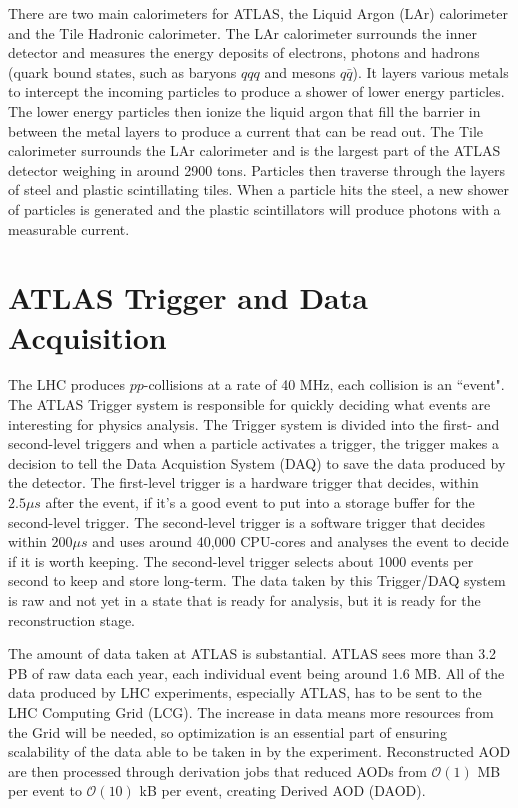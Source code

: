 There are two main calorimeters for ATLAS, the Liquid Argon (LAr) calorimeter and the Tile Hadronic calorimeter.
The LAr calorimeter surrounds the inner detector and measures the energy deposits of electrons, photons and hadrons (quark bound states, such as baryons $qqq$ and mesons $q\bar{q}$). 
It layers various metals to intercept the incoming particles to produce a shower of lower energy particles. 
The lower energy particles then ionize the liquid argon that fill the barrier in between the metal layers to produce a current that can be read out.
The Tile calorimeter surrounds the LAr calorimeter and is the largest part of the ATLAS detector weighing in around 2900 tons. 
Particles then traverse through the layers of steel and plastic scintillating tiles. 
When a particle hits the steel, a new shower of particles is generated and the plastic scintillators will produce photons with a measurable current.

\section{ATLAS Trigger and Data Acquisition}

The LHC produces $pp$-collisions at a rate of 40 MHz, each collision is an ``event". 
The ATLAS Trigger system is responsible for quickly deciding what events are interesting for physics analysis.
The Trigger system is divided into the first- and second-level triggers and when a particle activates a trigger, the trigger makes a decision to tell the Data Acquistion System (DAQ) to save the data produced by the detector. 
The first-level trigger is a hardware trigger that decides, within $2.5 \mu s$ after the event, if it's a good event to put into a storage buffer for the second-level trigger.
The second-level trigger is a software trigger that decides within $200 \mu s$ and uses around 40,000 CPU-cores and analyses the event to decide if it is worth keeping. 
The second-level trigger selects about 1000 events per second to keep and store long-term. \cite{Trigger-DAQ}
The data taken by this Trigger/DAQ system is raw and not yet in a state that is ready for analysis, but it is ready for the reconstruction stage. 

The amount of data taken at ATLAS is substantial.
ATLAS sees more than 3.2 PB of raw data each year, each individual event being around 1.6 MB. \cite{ATLAS_Fact_Sheet} 
All of the data produced by LHC experiments, especially ATLAS, has to be sent to the LHC Computing Grid (LCG). 
The increase in data means more resources from the Grid will be needed, so optimization is an essential part of ensuring scalability of the data able to be taken in by the experiment.
Reconstructed AOD are then processed through derivation jobs that reduced AODs from  $\mathcal{O}(1)$ MB per event to $\mathcal{O}(10)$ kB per event, creating Derived AOD (DAOD). 
